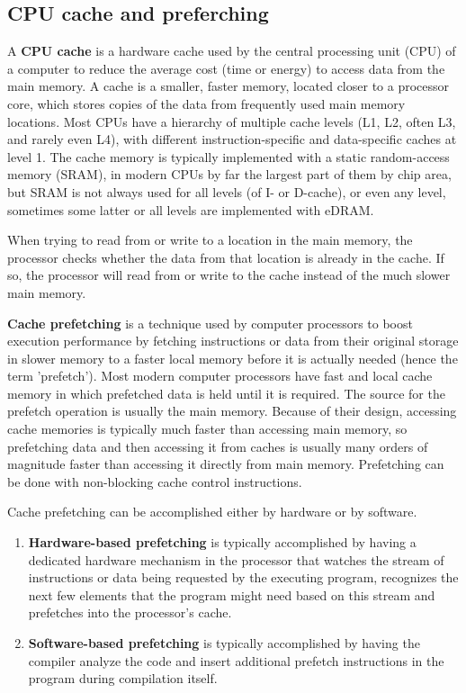 \documentclass[../main]{subfiles}
\begin{document}
\subsection{CPU cache and preferching}
    A \textbf{CPU cache} is a hardware cache used by the central processing unit (CPU) of a computer to reduce the average cost (time or energy)
to access data from the main memory. A cache is a smaller, faster memory, located closer to a processor core, which stores copies of the data from frequently used main memory locations.
Most CPUs have a hierarchy of multiple cache levels (L1, L2, often L3, and rarely even L4), with different instruction-specific and data-specific caches at level 1. The cache memory is typically implemented with a static random-access memory (SRAM), in modern CPUs by far the largest part of them by chip area, but SRAM is not always used for all levels
(of I- or D-cache), or even any level, sometimes some latter or all levels are implemented with eDRAM.\newline

    When trying to read from or write to a location in the main memory, the processor checks whether the data from that location is already in the cache.
If so, the processor will read from or write to the cache instead of the much slower main memory.\newline

    \textbf{Cache prefetching} is a technique used by computer processors to boost execution performance by fetching instructions or data from their original storage in slower
memory to a faster local memory before it is actually needed (hence the term 'prefetch'). Most modern computer processors have fast and local cache memory in which prefetched
data is held until it is required. The source for the prefetch operation is usually the main memory. Because of their design, accessing cache memories is typically
much faster than accessing main memory, so prefetching data and then accessing it from caches is usually many orders of magnitude faster than accessing it directly from main memory.
Prefetching can be done with non-blocking cache control instructions.\newline

    Cache prefetching can be accomplished either by hardware or by software.
\begin{enumerate}
    \item \textbf{Hardware-based prefetching} is typically accomplished by having a dedicated hardware mechanism in the processor that watches the stream of
    instructions or data being requested by the executing program, recognizes the next few elements that the program might need based on this stream and
    prefetches into the processor's cache.
    \item \textbf{Software-based prefetching} is typically accomplished by having the compiler analyze the code and insert additional prefetch instructions
    in the program during compilation itself.
\end{enumerate}
\end{document}
